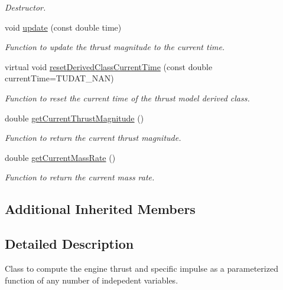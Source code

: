 \begin{DoxyCompactItemize}
\begin{DoxyCompactList}\small\item\em Destructor. \end{DoxyCompactList}\item 
void \hyperlink{classtudat_1_1propulsion_1_1ParameterizedThrustMagnitudeWrapper_a9986324434fea86a4e9b54d86e0200b3}{update} (const double time)
\begin{DoxyCompactList}\small\item\em Function to update the thrust magnitude to the current time. \end{DoxyCompactList}\item 
virtual void \hyperlink{classtudat_1_1propulsion_1_1ParameterizedThrustMagnitudeWrapper_aad77dd957a787846b3220792bc138fe6}{reset\+Derived\+Class\+Current\+Time} (const double current\+Time=T\+U\+D\+A\+T\+\_\+\+N\+AN)
\begin{DoxyCompactList}\small\item\em Function to reset the current time of the thrust model derived class. \end{DoxyCompactList}\item 
double \hyperlink{classtudat_1_1propulsion_1_1ParameterizedThrustMagnitudeWrapper_ae58d66ba89046b58507f1245f5184611}{get\+Current\+Thrust\+Magnitude} ()
\begin{DoxyCompactList}\small\item\em Function to return the current thrust magnitude. \end{DoxyCompactList}\item 
double \hyperlink{classtudat_1_1propulsion_1_1ParameterizedThrustMagnitudeWrapper_a20169ccccc57cba8106be96e0a9cc592}{get\+Current\+Mass\+Rate} ()
\begin{DoxyCompactList}\small\item\em Function to return the current mass rate. \end{DoxyCompactList}\end{DoxyCompactItemize}
\subsection*{Additional Inherited Members}


\subsection{Detailed Description}
Class to compute the engine thrust and specific impulse as a parameterized function of any number of indepedent variables.

